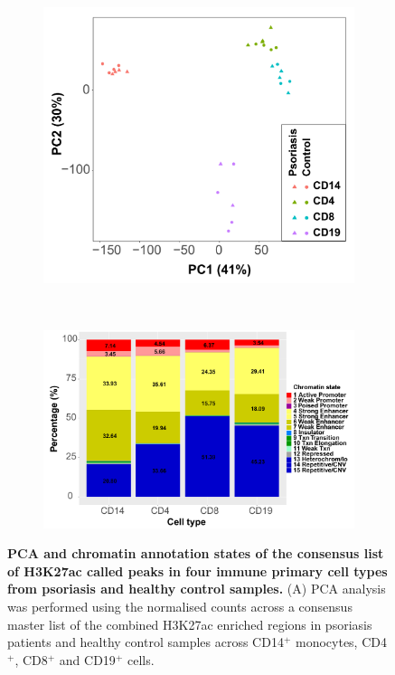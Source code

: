 \bigskip
\begin{figure}[htbp]
\centering
\begin{subfigure}[b]{0.45\textwidth}
\centering 
\includegraphics[width=\textwidth]{./Results2/pdfs/ChIPm_H3K27ac_all_cell_types_filtered_PCA}
\caption{}
\end{subfigure}
~
\begin{subfigure}[b]{0.5\textwidth} 
\centering
\includegraphics[width=\textwidth]{./Results2/pdfs/ChIPm_H3K27ac_cell_type_specific_master_list_chromatin_states_annotated_filtered}
\caption{}
\end{subfigure}
\caption[PCA and chromatin annotation states of the consensus list of H3K27ac called peaks in four immune primary cell types from psoriasis and healthy control samples.]{\textbf{PCA and chromatin annotation states of the consensus list of H3K27ac called peaks in four immune primary cell types from psoriasis and healthy control samples.} (A) PCA analysis was performed using the normalised counts across a consensus master list of the combined H3K27ac enriched regions in psoriasis patients and healthy control samples across CD14$^+$ monocytes, CD4$^+$, CD8$^+$ and CD19$^+$ cells. %
}
\end{figure}
